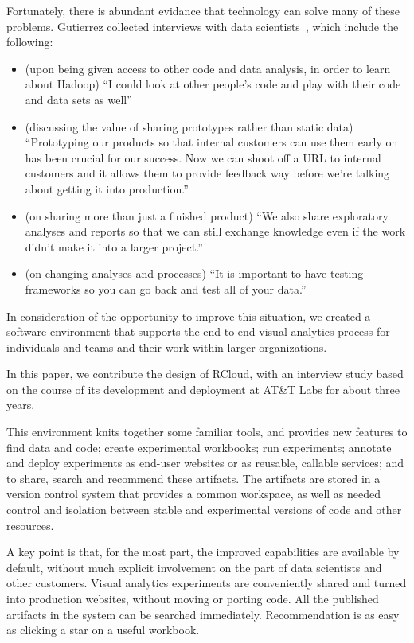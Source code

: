 Fortunately, there is abundant evidance that technology can
solve many of these problems.
Gutierrez collected interviews with data scientists~\cite{Gutierrez:2014:DSA},
which include the following:

\begin{itemize}
\item (upon being given access to other code and data analysis, in
order to learn about Hadoop) ``I could look at other people’s code
and play with their code and data sets as well''
\item (discussing the value of sharing prototypes rather than static
data) ``Prototyping our products so that internal
customers can use them early on has been crucial for
our success. Now we can shoot off a URL to internal
customers and it allows them to provide feedback way before
we're talking about getting it into production.''
\item (on sharing more than just a finished product) ``We also share
exploratory analyses and reports so that we can still exchange
knowledge even if the work didn't make it into a larger project.''
\item (on changing analyses and processes) ``It is important to
have testing frameworks so you can go back and test all
of your data.''
\end{itemize}

In consideration of the opportunity to improve this situation,
we created a software environment that supports the end-to-end
visual analytics process for individuals and teams and
their work within larger organizations.


In this paper, we contribute the
design of RCloud, with an interview study based on the
course of its development and deployment at AT\&T Labs for 
about three years.

This environment knits together some familiar tools, and 
provides new features to find data and code; create experimental workbooks;
run experiments; annotate and deploy experiments as end-user websites or
as reusable, callable services; and to share, search and recommend these artifacts. The artifacts are stored in a version
control system that provides a common workspace, as well as needed control
and isolation between stable and experimental versions of code and other
resources. 

A key point is that, for the most part, the improved capabilities are
available by default, without much explicit involvement on the part of
data scientists and other customers. Visual analytics experiments are
conveniently shared and turned into production websites, without moving
or porting code. All the published artifacts in the system can be
searched immediately. Recommendation is as easy as clicking a star
on a useful workbook.

